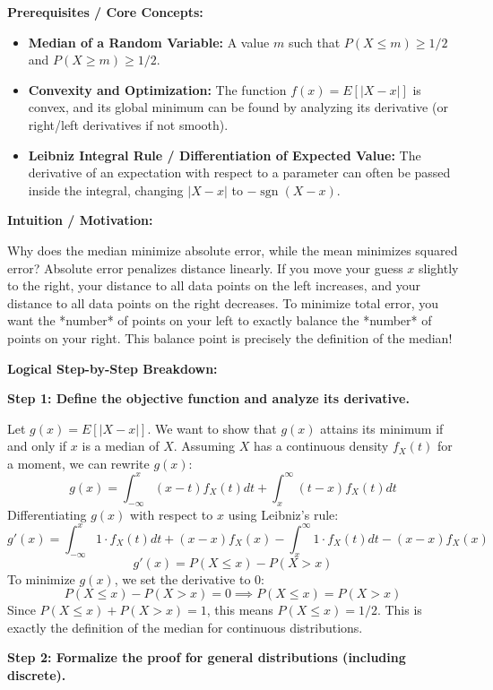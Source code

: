 \begin{solution}
\textbf{Prerequisites / Core Concepts:}
\begin{itemize}
    \item \textbf{Median of a Random Variable:} A value $m$ such that $P(X \leq m) \geq 1/2$ and $P(X \geq m) \geq 1/2$.
    \item \textbf{Convexity and Optimization:} The function $f(x) = E[|X-x|]$ is convex, and its global minimum can be found by analyzing its derivative (or right/left derivatives if not smooth).
    \item \textbf{Leibniz Integral Rule / Differentiation of Expected Value:} The derivative of an expectation with respect to a parameter can often be passed inside the integral, changing $|X-x|$ to $-\operatorname{sgn}(X-x)$.
\end{itemize}

\textbf{Intuition / Motivation:}

Why does the median minimize absolute error, while the mean minimizes squared error? Absolute error penalizes distance linearly. If you move your guess $x$ slightly to the right, your distance to all data points on the left increases, and your distance to all data points on the right decreases. To minimize total error, you want the *number* of points on your left to exactly balance the *number* of points on your right. This balance point is precisely the definition of the median!

\textbf{Logical Step-by-Step Breakdown:}

\textbf{Step 1: Define the objective function and analyze its derivative.}

Let $g(x) = E[|X-x|]$. We want to show that $g(x)$ attains its minimum if and only if $x$ is a median of $X$.
Assuming $X$ has a continuous density $f_X(t)$ for a moment, we can rewrite $g(x)$:
\[ g(x) = \int_{-\infty}^x (x-t) f_X(t) dt + \int_x^\infty (t-x) f_X(t) dt \]
Differentiating $g(x)$ with respect to $x$ using Leibniz's rule:
\[ g'(x) = \int_{-\infty}^x 1 \cdot f_X(t) dt + (x-x)f_X(x) - \int_x^\infty 1 \cdot f_X(t) dt - (x-x)f_X(x) \]
\[ g'(x) = P(X \leq x) - P(X > x) \]
To minimize $g(x)$, we set the derivative to $0$:
\[ P(X \leq x) - P(X > x) = 0 \implies P(X \leq x) = P(X > x) \]
Since $P(X \leq x) + P(X > x) = 1$, this means $P(X \leq x) = 1/2$. This is exactly the definition of the median for continuous distributions.

\textbf{Step 2: Formalize the proof for general distributions (including discrete).}


\end{solution}
